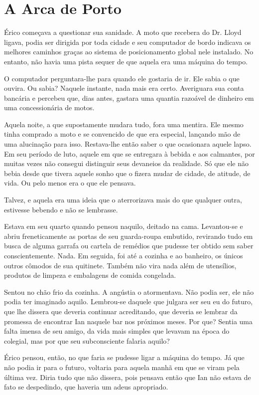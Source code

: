 \chapter{A Arca de Porto}

Érico começava a questionar sua sanidade. A moto que recebera do Dr.
Lloyd ligava, podia ser dirigida por toda cidade e seu computador de
bordo indicava os melhores caminhos graças ao sistema de posicionamento
global nele instalado. No entanto, não havia uma pista sequer de que
aquela era uma máquina do tempo.

O computador perguntara-lhe para quando ele gostaria de ir. Ele sabia o
que ouvira. Ou sabia? Naquele instante, nada mais era certo. Averiguara
sua conta bancária e percebeu que, dias antes, gastara uma quantia
razoável de dinheiro em uma concessionária de motos.

Aquela noite, a que supostamente mudara tudo, fora uma mentira. Ele
mesmo tinha comprado a moto e se convencido de que era especial,
lançando mão de uma alucinação para isso. Restava-lhe então saber o que
ocasionara aquele lapso. Em seu período de luto, aquele em que se
entregara à bebida e aos calmantes, por muitas vezes não consegui
distinguir seus devaneios da realidade. Só que ele não bebia desde que
tivera aquele sonho que o fizera mudar de cidade, de atitude, de vida.
Ou pelo menos era o que ele pensava.

Talvez, e aquela era uma ideia que o aterrorizava mais do que qualquer
outra, estivesse bebendo e não se lembrasse.

Estava em seu quarto quando pensou naquilo, deitado na cama. Levantou-se
e abriu freneticamente as portas de seu guarda-roupa embutido, revirando
tudo em busca de alguma garrafa ou cartela de remédios que pudesse ter
obtido sem saber conscientemente. Nada. Em seguida, foi até a cozinha e
ao banheiro, os únicos outros cômodos de sua quitinete. Também não vira
nada além de utensílios, produtos de limpeza e embalagens de comida
congelada.

Sentou no chão frio da cozinha. A angústia o atormentava. Não podia ser,
ele não podia ter imaginado aquilo. Lembrou-se daquele que julgara ser
seu eu do futuro, que lhe dissera que deveria continuar acreditando, que
deveria se lembrar da promessa de encontrar Ian naquele bar nos próximos
meses. Por que? Sentia uma falta imensa de seu amigo, da vida mais
simples que levavam na época do colegial, mas por que seu subconsciente
falaria aquilo?

Érico pensou, então, no que faria se pudesse ligar a máquina do tempo.
Já que não podia ir para o futuro, voltaria para aquela manhã em que se
viram pela última vez. Diria tudo que não dissera, pois pensava então
que Ian não estava de fato se despedindo, que haveria um adeus
apropriado.

